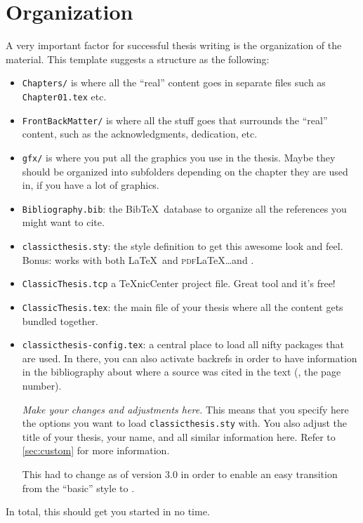 \section{Organization}
A very important factor for successful thesis writing is the organization of the material. This template suggests a structure as the following:
\begin{itemize}
\item\texttt{Chapters/} is where all the ``real'' content goes in separate files such as \texttt{Chapter01.tex} etc.
\item\texttt{FrontBackMatter/} is where all the stuff goes that surrounds the ``real'' content, such as the acknowledgments, dedication, etc.
\item\texttt{gfx/} is where you put all the graphics you use in the thesis. Maybe they should be organized into subfolders depending on the chapter they are used in, if you have a lot of graphics.
\item\texttt{Bibliography.bib}: the Bib\TeX\ database to organize all the references you might want to cite.
\item\texttt{classicthesis.sty}: the style definition to get this awesome look and feel. Bonus: works with both \LaTeX\ and \textsc{pdf}\LaTeX\dots and \mLyX.
\item\texttt{ClassicThesis.tcp} a \TeX nicCenter project file. Great tool and it's free!
\item\texttt{ClassicThesis.tex}: the main file of your thesis where all the content gets bundled together.
\item\texttt{classicthesis-config.tex}: a central place to load all nifty packages that are used. In there, you can also activate backrefs in order to have information in the bibliography about where a source was cited in the text (\ie, the page number).
    
\emph{Make your changes and adjustments here.} This means that you specify here the options you want to load \texttt{classicthesis.sty} with. You also adjust the title of your thesis, your name, and all similar information here. Refer to \autoref{sec:custom} for more information.

This had to change as of version 3.0 in order to enable an easy transition from the ``basic'' style to \mLyX.
\end{itemize}

\noindent In total, this should get you started in no time.

